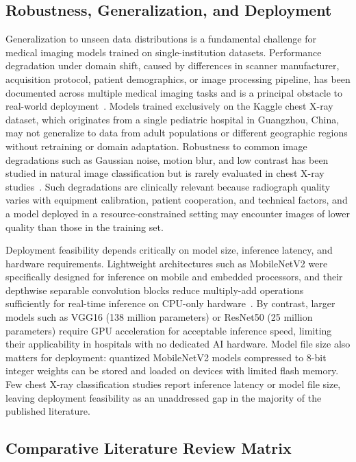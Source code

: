 \documentclass[preprint,12pt]{elsarticle}
\begin{document}
\subsection{Robustness, Generalization, and Deployment}
Generalization to unseen data distributions is a fundamental challenge
for medical imaging models trained on single-institution datasets.
Performance degradation under domain shift, caused by differences in
scanner manufacturer, acquisition protocol, patient demographics, or
image processing pipeline, has been documented across multiple medical
imaging tasks and is a principal obstacle to real-world
deployment~\cite{hashmi2020}.
Models trained exclusively on the Kaggle chest X-ray dataset, which
originates from a single pediatric hospital in Guangzhou, China, may
not generalize to data from adult populations or different geographic
regions without retraining or domain adaptation.
Robustness to common image degradations such as Gaussian noise,
motion blur, and low contrast has been studied in natural image
classification but is rarely evaluated in chest X-ray
studies~\cite{reshan2023}.
Such degradations are clinically relevant because radiograph quality
varies with equipment calibration, patient cooperation, and technical
factors, and a model deployed in a resource-constrained setting may
encounter images of lower quality than those in the training set.

Deployment feasibility depends critically on model size, inference
latency, and hardware requirements.
Lightweight architectures such as MobileNetV2 were specifically
designed for inference on mobile and embedded processors, and their
depthwise separable convolution blocks reduce multiply-add operations
sufficiently for real-time inference on CPU-only
hardware~\cite{mobilenetv2}.
By contrast, larger models such as VGG16 (138 million parameters) or
ResNet50 (25 million parameters) require GPU acceleration for
acceptable inference speed, limiting their applicability in hospitals
with no dedicated AI hardware.
Model file size also matters for deployment: quantized MobileNetV2
models compressed to 8-bit integer weights can be stored and loaded
on devices with limited flash memory.
Few chest X-ray classification studies report inference latency or
model file size, leaving deployment feasibility as an unaddressed
gap in the majority of the published literature.

\subsection{Comparative Literature Review Matrix}
\end{document}
